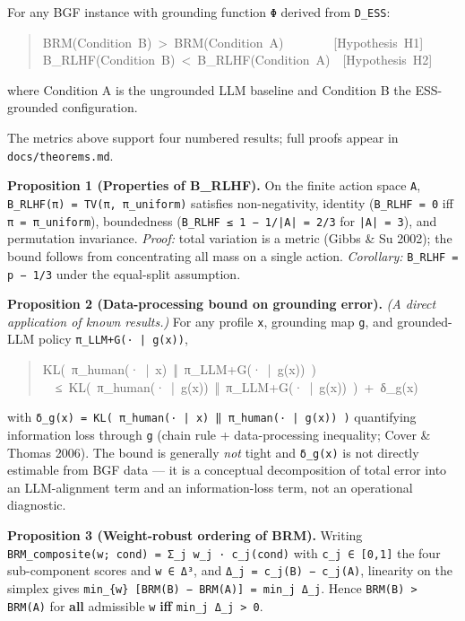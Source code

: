 
For any BGF instance with grounding function \texttt{Φ} derived from \texttt{D\_ESS}:

\begin{quote}\ttfamily\small\noindent
BRM(Condition~B)~>~BRM(Condition~A)~~~~~~~~[Hypothesis~H1] \\B\_RLHF(Condition~B)~<~B\_RLHF(Condition~A)~~[Hypothesis~H2]
\end{quote}

where Condition A is the ungrounded LLM baseline and Condition B the ESS-grounded configuration.


The metrics above support four numbered results; full proofs appear in \texttt{docs/theorems.md}.

\textbf{Proposition 1 (Properties of B\_RLHF).} On the finite action space \texttt{A}, \texttt{B\_RLHF(π) = TV(π, π\_uniform)} satisfies non-negativity, identity (\texttt{B\_RLHF = 0} iff \texttt{π = π\_uniform}), boundedness (\texttt{B\_RLHF ≤ 1 − 1/|A| = 2/3} for \texttt{|A| = 3}), and permutation invariance. \textit{Proof:} total variation is a metric (Gibbs \& Su 2002); the bound follows from concentrating all mass on a single action. \textit{Corollary:} \texttt{B\_RLHF = p − 1/3} under the equal-split assumption.

\textbf{Proposition 2 (Data-processing bound on grounding error).} \textit{(A direct application of known results.)} For any profile \texttt{x}, grounding map \texttt{g}, and grounded-LLM policy \texttt{π\_LLM+G(· | g(x))},

\begin{quote}\ttfamily\small\noindent
KL(~π\_human(·~|~x)~‖~π\_LLM+G(·~|~g(x))~) \\~~≤~KL(~π\_human(·~|~g(x))~‖~π\_LLM+G(·~|~g(x))~)~+~δ\_g(x)
\end{quote}

with \texttt{δ\_g(x) = KL( π\_human(· | x) ‖ π\_human(· | g(x)) )} quantifying information loss through \texttt{g} (chain rule + data-processing inequality; Cover \& Thomas 2006). The bound is generally \textit{not} tight and \texttt{δ\_g(x)} is not directly estimable from BGF data — it is a conceptual decomposition of total error into an LLM-alignment term and an information-loss term, not an operational diagnostic.

\textbf{Proposition 3 (Weight-robust ordering of BRM).} Writing \texttt{BRM\_composite(w; cond) = Σ\_j w\_j · c\_j(cond)} with \texttt{c\_j ∈ [0,1]} the four sub-component scores and \texttt{w ∈ Δ³}, and \texttt{Δ\_j = c\_j(B) − c\_j(A)}, linearity on the simplex gives \texttt{min\_\{w\} [BRM(B) − BRM(A)] = min\_j Δ\_j}. Hence \texttt{BRM(B) > BRM(A)} for \textbf{all} admissible \texttt{w} \textbf{iff} \texttt{min\_j Δ\_j > 0}.

